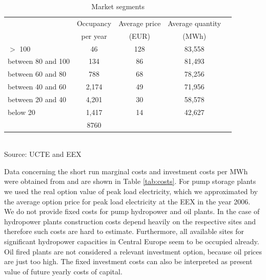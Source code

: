 \begin{table}[htb]
\centering
\caption{Market segments}
\vspace{0.3cm}
\begin{tabular}{lrrrr}
\hline
 & \multicolumn{1}{c}{Occupancy} & \multicolumn{1}{c}{Average price} & \multicolumn{1}{c}{Average quantity} &  \\ 
 & \multicolumn{1}{c}{per year} & \multicolumn{1}{c}{(EUR)} & \multicolumn{1}{c}{(MWh)} &  \\ 
 \hline
$>$ 100 & \multicolumn{1}{c}{46} & \multicolumn{1}{c}{128} & \multicolumn{1}{c}{83,558} &  \\ 
between 80 and 100 & \multicolumn{1}{c}{134} & \multicolumn{1}{c}{86} & \multicolumn{1}{c}{81,493} &  \\ 
between 60 and 80 & \multicolumn{1}{c}{788} & \multicolumn{1}{c}{68} & \multicolumn{1}{c}{78,256} &  \\ 
between 40 and 60 & \multicolumn{1}{c}{2,174} & \multicolumn{1}{c}{49} & \multicolumn{1}{c}{71,956} &  \\ 
between 20 and 40 & \multicolumn{1}{c}{4,201} & \multicolumn{1}{c}{30} & \multicolumn{1}{c}{58,578} &  \\ 
below 20 & \multicolumn{1}{c}{1,417} & \multicolumn{1}{c}{14} & \multicolumn{1}{c}{42,627} &  \\
\hline
 & \multicolumn{1}{c}{8760} &  &  &  \\ 
 \hline
\end{tabular}
\label{tab:demand}
\\
\vspace{0.3cm}
\scriptsize Source: UCTE and EEX 
\end{table}


Data concerning the short run marginal costs and investment costs per MWh were obtained from \cite{Auer2006} and are shown in Table \ref{tab:costs}. For pump storage plants we used the real option value of peak load electricity, which we approximated by the average option price for peak load electricity at the EEX in the year 2006. We do not provide fixed costs for pump hydropower and oil plants. In the case of hydropower plants construction costs depend heavily on the respective sites and therefore such costs are hard to estimate. Furthermore, all available sites for significant hydropower capacities in Central Europe seem to be occupied already. Oil fired plants are not considered a relevant investment option, because oil prices are just too high. The fixed investment costs can also be interpreted as present value of future yearly costs of capital.

